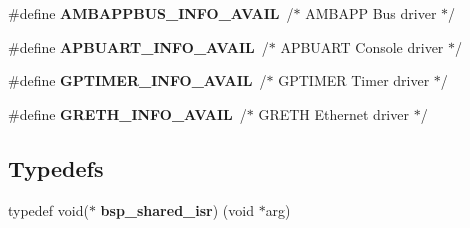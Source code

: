 \begin{DoxyCompactItemize}
\#define {\bfseries A\+M\+B\+A\+P\+P\+B\+U\+S\+\_\+\+I\+N\+F\+O\+\_\+\+A\+V\+A\+IL}~/$\ast$ A\+M\+B\+A\+PP Bus driver $\ast$/
\item 
\mbox{\label{group__RTEMSBSPsSPARCLEON3_gaac7662be5ffaff4a65f37b8e3a301faa}} 
\#define {\bfseries A\+P\+B\+U\+A\+R\+T\+\_\+\+I\+N\+F\+O\+\_\+\+A\+V\+A\+IL}~/$\ast$ A\+P\+B\+U\+A\+RT Console driver $\ast$/
\item 
\mbox{\label{group__RTEMSBSPsSPARCLEON3_ga7e2a6d4e9669c475b2d90952d8860764}} 
\#define {\bfseries G\+P\+T\+I\+M\+E\+R\+\_\+\+I\+N\+F\+O\+\_\+\+A\+V\+A\+IL}~/$\ast$ G\+P\+T\+I\+M\+ER Timer driver $\ast$/
\item 
\mbox{\label{group__RTEMSBSPsSPARCLEON3_ga118faf137e751f44e394972e73a8cacb}} 
\#define {\bfseries G\+R\+E\+T\+H\+\_\+\+I\+N\+F\+O\+\_\+\+A\+V\+A\+IL}~/$\ast$ G\+R\+E\+TH Ethernet driver $\ast$/
\end{DoxyCompactItemize}
\subsection*{Typedefs}
\begin{DoxyCompactItemize}
\item 
\mbox{\label{group__RTEMSBSPsSPARCLEON3_ga5ab827b319fd4d84eebf884a6e2b6a24}} 
typedef void($\ast$ {\bfseries bsp\+\_\+shared\+\_\+isr}) (void $\ast$arg)
\end{DoxyCompactItemize}
